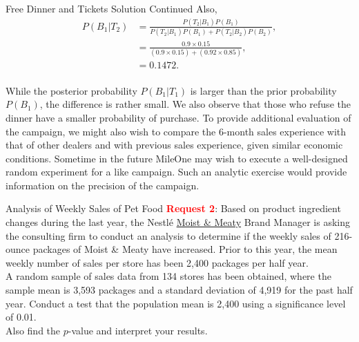 \documentclass[pdf]{beamer}
\theoremstyle{remark}
\theoremstyle{definition}
\begin{document}
\begin{frame}[t]{Free Dinner and Tickets Solution Continued}
\small
Also, 
\begin{align*}
P(B_1 | T_2) & = \frac{P(T_2 | B_1) P(B_1)}{P(T_2 | B_1) P(B_1) + P(T_2 | B_2) P(B_2)}, \\
             & = \frac{0.9 \times 0.15}{(0.9 \times 0.15)+(0.92 \times 0.85)}, \\
             & = 0.1472.
\end{align*}
\\
\vspace{-1.0ex}
While the posterior probability $P(B_1 | T_1)$ is larger than the prior probability $P(B_1)$, the difference is rather small.  We also observe that those who refuse the dinner have a smaller probability of purchase. To provide additional evaluation of the campaign, we might also wish to compare the 6-month sales experience with that of other dealers and with previous sales experience, given similar economic conditions.  Sometime in the future MileOne may wish to execute a well-designed random experiment for a like campaign.  Such an analytic exercise would provide information on the precision of the campaign. 
\end{frame}

\begin{frame}[t]{Analysis of Weekly Sales of Pet Food}
\textcolor{red}{\textbf{Request 2}}:  Based on product ingredient changes during the last year, the Nestl\'{e} \href{https://www.purina.com/moist-meaty}{Moist \& Meaty} Brand Manager is asking the consulting firm to conduct an analysis to determine if the weekly sales of 216-ounce packages of Moist \& Meaty have increased.  Prior to this year, the mean weekly number of sales per store has been 2,400 packages per half year.  \\
\vspace{1.5ex}
A random sample of sales data from 134 stores has been obtained, where the sample mean is 3,593 packages and a standard deviation of 4,919 for the past half year.  Conduct a test that the population mean is 2,400 using a significance level of 0.01.  \\
\vspace{1.5ex}
Also find the $p$-value and interpret your results. 
\end{frame}
\end{document}
